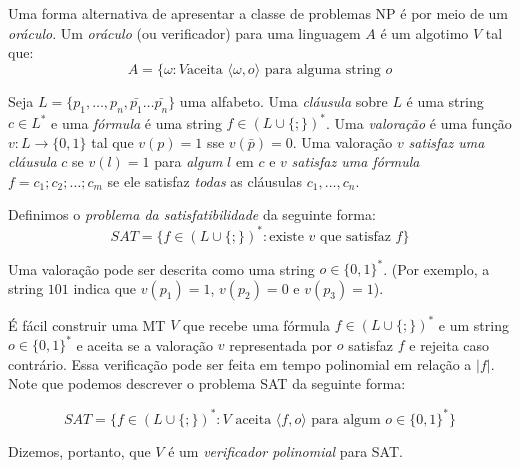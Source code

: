 Uma forma alternativa de apresentar a classe de problemas NP é por meio de um {\em oráculo}.
Um {\em oráculo} (ou verificador) para uma linguagem $A$ é um algotimo $V$ tal que:
\begin{displaymath}
  A = \{\omega : V \textrm{aceita $\langle \omega, o \rangle$ para alguma string $o$}
\end{displaymath}

\begin{example}
  Seja $L = \{p_1, \dots, p_n, \bar{p_1} \dots \bar{p_n}\}$ uma alfabeto.
  Uma {\em cláusula} sobre $L$ é uma string $c \in L^*$ e uma {\em fórmula} é uma string $f \in (L\cup\{;\})^*$.
  Uma {\em valoração} é uma função $v : L \to \{0,1\}$ tal que $v(p) = 1$ sse $v(\bar{p}) = 0$.
  Uma valoração $v$ {\em satisfaz uma cláusula} $c$ se $v(l) = 1$ para {\em algum} $l$ em $c$ e $v$ {\em satisfaz uma fórmula} $f = c_1;c_2;\dots;c_m$ se ele satisfaz {\em todas} as cláusulas $c_1, \dots, c_n$.

  Definimos o {\em problema da satisfatibilidade} da seguinte forma:
  \begin{displaymath}
    SAT = \{f \in (L \cup \{;\})^*: \textrm{existe $v$ que satisfaz $f$}\}
  \end{displaymath}

  Uma valoração pode ser descrita como uma string $o \in \{0,1\}^*$.
  (Por exemplo, a string $101$ indica que $v(p_1) = 1$, $v(p_2) = 0$ e $v(p_3) = 1$).

  É fácil construir uma MT $V$ que recebe uma fórmula $f \in (L \cup \{;\})^*$ e um string $o \in \{0,1\}^*$ e aceita se a valoração $v$ representada por $o$ satisfaz $f$ e rejeita caso contrário.
  Essa verificação pode ser feita em tempo polinomial em relação a $|f|$.
  Note que podemos descrever o problema SAT da seguinte forma:

  \begin{displaymath}
    SAT = \{f \in (L \cup \{;\})^*: \textrm{$V$ aceita $\langle f, o \rangle$ para algum $o \in \{0,1\}^*$}\}
  \end{displaymath}
  
  Dizemos, portanto, que $V$ é um {\em verificador polinomial} para SAT.
\end{example}

